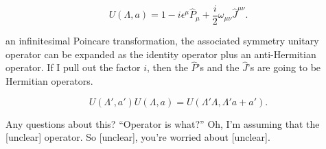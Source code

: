 \[
  U(\Lambda,a)
  =1-i\epsilon^\mu\hat P_\mu
   +\frac{i}{2}\omega_{\mu\nu}\hat J^{\mu\nu}.
\]

\noindent
an infinitesimal Poincare transformation, the associated symmetry unitary operator can be expanded as the identity operator plus an anti-Hermitian operator. If I pull out the factor $i$, then the $\hat P$'s and the $\hat J$'s are going to be Hermitian operators.

\[
  U(\Lambda',a')U(\Lambda,a)
  =U(\Lambda'\Lambda,\Lambda'a+a').
\]

\medskip
\noindent
Any questions about this? \textquotedblleft Operator is what?\textquotedblright{} Oh, I'm assuming that the [unclear] operator. So [unclear], you're worried about [unclear].

